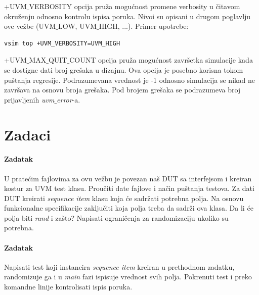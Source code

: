 +UVM\(\_\)VERBOSITY opcija pruža mogućnost promene verbosity u čitavom okruženju
odnosno kontrolu ispisa poruka. Nivoi su opisani u drugom poglavlju ove vežbe
(UVM\(\_\)LOW, UVM\(\_\)HIGH, ...). Primer upotrebe:

\begin{lstlisting}
vsim top +UVM_VERBOSITY=UVM_HIGH
\end{lstlisting}

+UVM\(\_\)MAX\(\_\)QUIT\(\_\)COUNT opcija pruža mogućnost završetka simulacije
kada se dostigne dati broj grešaka u dizajnu. Ova opcija je posebno korisna
tokom puštanja regresije. Podrazumevana vrednost je -1 odnosno simulacija se
nikad ne završava na osnovu broja grešaka. Pod brojem grešaka se podrazumeva
broj prijavljenih \emph{uvm\(\_\)error}-a.


\section{Zadaci}

\paragraph{Zadatak}

U pratećim fajlovima za ovu vežbu je povezan naš DUT sa interfejsom i kreiran
kostur za UVM test klasu. Proučiti date fajlove i način puštanja testova.
Za dati DUT kreirati \emph{sequence item} klasu koja će sadržati potrebna
polja. Na osnovu funkcionalne specifikacije zaključiti koja polja treba da
sadrži ova klasa. Da li će polja biti \emph{rand} i zašto? Napisati ograničenja
za randomizaciju ukoliko su potrebna.

\paragraph{Zadatak}

Napisati test koji instancira \emph{sequence item} kreiran u prethodnom zadatku,
randomizuje ga i u \emph{main} fazi ispisuje vrednost svih polja.
Pokrenuti test i preko komandne linije kontrolisati ispis poruka.


